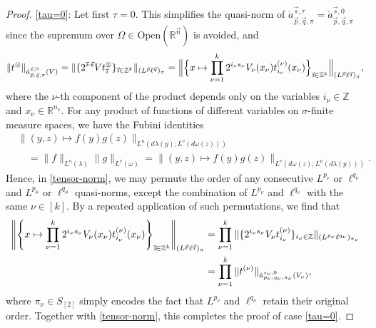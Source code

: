 \documentclass[11pt, reqno]{amsart}
\theoremstyle{definition}
\theoremstyle{remark}
\numberwithin{equation}{section}
\newcommand{\R}{\mathbb R}
\newcommand{\Z}{\mathbb Z}
\newcommand{\vi}{\vec{\textit{\i}}}
\newcommand{\vn}{\vec n}
\newcommand{\vp}{\vec p}
\newcommand{\vq}{\vec q}
\newcommand{\vs}{\vec s}
\newcommand{\atau}{\dot a^{\vs,\tau}_{\vp,\vq,\pi}}
\newcommand{\asn}{\dot a^{\vs,0}_{\vp,\vq,\pi}}
\newcommand{\Norm}[2]{\|#1\|_{#2}}
\newcommand{\BNorm}[2]{\Big\|#1\Big\|_{#2}}
\newcommand{\Open}{\mathrm{Open}}
\begin{document}
\begin{proof}
\eqref{tau=0}: Let first $\tau=0$. This simplifies the quasi-norm of $\atau=\asn$ since the supremum over $\Omega\in\Open(\R^{\vn})$ is avoided, and
\begin{equation}\label{tensor-norm}
\Norm{t^{\otimes}}{\asn(V)}
=\Norm{\{2^{\vi\cdot\vs}Vt_{\vi}^{\otimes}\}_{\vi\in\Z^k}}{(L^{\vp}\ell^{\vq})_\pi}
=\BNorm{\Big\{x\mapsto\prod_{\nu=1}^k 2^{i_\nu s_\nu}V_{\nu}(x_\nu)t^{(\nu)}_{i_\nu}(x_\nu)\Big\}_{\vi\in\Z^k}}{(L^{\vp}\ell^{\vq})_\pi},
\end{equation}
where the $\nu$-th component of the product depends only on the variables $i_\nu\in\Z$ and $x_\nu\in\R^{n_\nu}$. For any product of functions of different variables on $\sigma$-finite measure spaces, we have the Fubini identities
\begin{align*}
&\Norm{(y,z)\mapsto f(y)g(z)}{L^u(d\lambda(y);L^v(d\omega(z)))} \\
&\quad=\Norm{f}{L^u(\lambda)}\Norm{g}{L^v(\omega)}
=\Norm{(y,z)\mapsto f(y)g(z)}{L^v(d\omega(z);L^u(d\lambda(y)))}.
\end{align*}
Hence, in \eqref{tensor-norm}, we may permute the order of any consecutive $L^{p_\nu}$ or $\ell^{q_\nu}$ and $L^{p_\mu}$ or $\ell^{q_\mu}$ quasi-norms, except the combination of $L^{p_\nu}$ and $\ell^{q_\nu}$ with the same $\nu\in[k]$. By a repeated application of such permutations, we find that
\begin{equation*}
\begin{split}
\Bigg\|\Bigg\{x\mapsto\prod_{\nu=1}^k 2^{i_\nu s_\nu}V_\nu(x_\nu)t^{(\nu)}_{i_\nu}(x_\nu)\Bigg\}_{\vi\in\Z^k}\Bigg\|_{(L^{\vp}\ell^{\vq})_\pi}
&=\prod_{\nu=1}^k  \Norm{ \{2^{i_\nu s_\nu } V_\nu t_{i_\nu}^{(\nu)} \}_{i_\nu\in\Z} }{ (L^{p_\nu}\ell^{q_\nu})_{\pi_\nu}}  \\
&=\prod_{\nu=1}^k \Norm{ t^{(\nu)}}{ \dot a^{s_\nu,0}_{p_\nu,q_\nu,\pi_\nu} (V_\nu)},
\end{split}
\end{equation*}
where $\pi_\nu\in S_{[2]}$ simply encodes the fact that $L^{p_\nu}$ and $\ell^{q_\nu}$ retain their original order. Together with \eqref{tensor-norm}, this completes the proof of case \eqref{tau=0}.


\end{proof}
\end{document}
